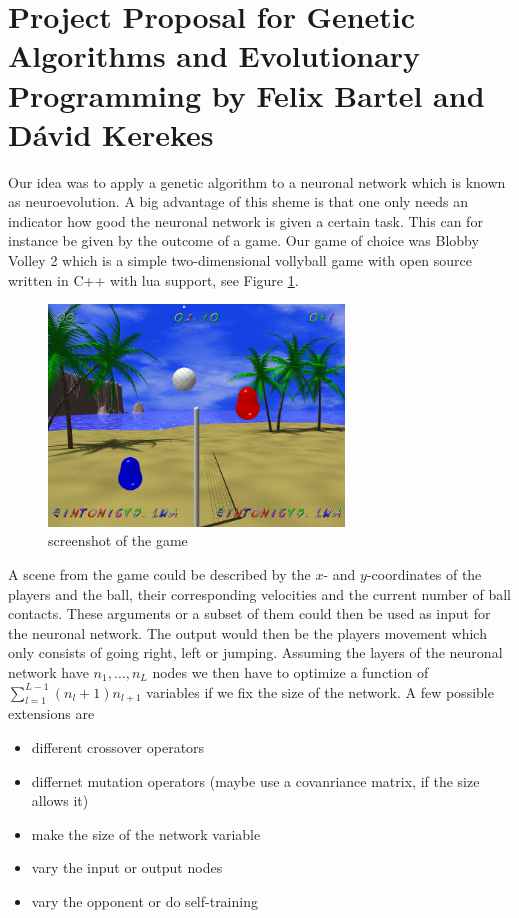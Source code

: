 \documentclass[11pt,a4paper]{scrartcl}
\date{}
\begin{document}
\section*{Project Proposal for Genetic Algorithms and Evolutionary Programming
by Felix Bartel and D\' avid Kerekes}

Our idea was to apply a genetic algorithm to a neuronal network which is known as neuroevolution.
A big advantage of this sheme is that one only needs an indicator how good the neuronal network is given a certain task.
This can for instance be given by the outcome of a game.
Our game of choice was Blobby Volley 2 which is a simple two-dimensional vollyball game with open source written in C++ with lua support, see Figure \ref{fig:screenshot}.

\begin{figure}[H]
\center
\includegraphics[width=0.7\textwidth]{img/screenshot.png}
\caption{screenshot of the game}
\label{fig:screenshot}
\end{figure}

A scene from the game could be described by the $x$- and $y$-coordinates of the players and the ball, their corresponding velocities and the current number of ball contacts.
These arguments or a subset of them could then be used as input for the neuronal network.
The output would then be the players movement which only consists of going right, left or jumping.
Assuming the layers of the neuronal network have $n_1,\dots,n_L$ nodes we then have to optimize a function of $\sum_{l=1}^{L-1} (n_l+1)n_{l+1}$ variables if we fix the size of the network.
A few possible extensions are
\begin{itemize}
\item different crossover operators
\item differnet mutation operators (maybe use a covanriance matrix, if the size allows it)
\item make the size of the network variable
\item vary the input or output nodes
\item vary the opponent or do self-training
\end{itemize}
\end{document}
